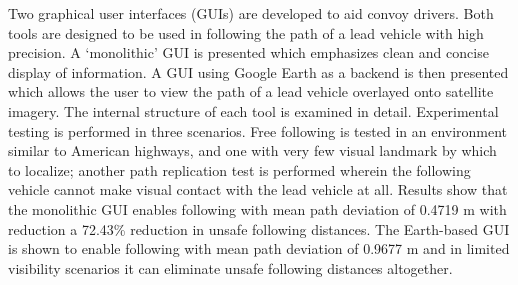 Two graphical user interfaces (GUIs) are developed to aid convoy drivers.
Both tools are designed to be used in following the path of a lead vehicle with high precision.
A `monolithic' GUI is presented which emphasizes clean and concise display of information.
A GUI using Google Earth as a backend is then presented which allows the user to view the path of a lead vehicle overlayed onto satellite imagery.
The internal structure of each tool is examined in detail.
Experimental testing is performed in three scenarios.
Free following is tested in an environment similar to American highways, and one with very few visual landmark by which to localize; another path replication test is performed wherein the following vehicle cannot make visual contact with the lead vehicle at all.
Results show that the monolithic GUI enables following with mean path deviation of 0.4719 m with reduction a 72.43\% reduction in unsafe following distances. The Earth-based GUI is shown to enable following with mean path deviation of 0.9677 m and in limited visibility scenarios it can eliminate unsafe following distances altogether.

